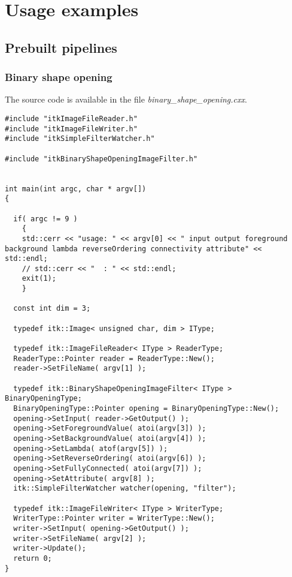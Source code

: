 \documentclass{InsightArticle}
\begin{document}
\section{Usage examples}

\subsection{Prebuilt pipelines}

\subsubsection{Binary shape opening}

The source code is available in the file {\em binary\_shape\_opening.cxx}.

\small \begin{verbatim}
#include "itkImageFileReader.h"
#include "itkImageFileWriter.h"
#include "itkSimpleFilterWatcher.h"

#include "itkBinaryShapeOpeningImageFilter.h"


int main(int argc, char * argv[])
{

  if( argc != 9 )
    {
    std::cerr << "usage: " << argv[0] << " input output foreground background lambda reverseOrdering connectivity attribute" << std::endl;
    // std::cerr << "  : " << std::endl;
    exit(1);
    }

  const int dim = 3;

  typedef itk::Image< unsigned char, dim > IType;

  typedef itk::ImageFileReader< IType > ReaderType;
  ReaderType::Pointer reader = ReaderType::New();
  reader->SetFileName( argv[1] );

  typedef itk::BinaryShapeOpeningImageFilter< IType > BinaryOpeningType;
  BinaryOpeningType::Pointer opening = BinaryOpeningType::New();
  opening->SetInput( reader->GetOutput() );
  opening->SetForegroundValue( atoi(argv[3]) );
  opening->SetBackgroundValue( atoi(argv[4]) );
  opening->SetLambda( atof(argv[5]) );
  opening->SetReverseOrdering( atoi(argv[6]) );
  opening->SetFullyConnected( atoi(argv[7]) );
  opening->SetAttribute( argv[8] );
  itk::SimpleFilterWatcher watcher(opening, "filter");

  typedef itk::ImageFileWriter< IType > WriterType;
  WriterType::Pointer writer = WriterType::New();
  writer->SetInput( opening->GetOutput() );
  writer->SetFileName( argv[2] );
  writer->Update();
  return 0;
}

\end{verbatim} \normalsize
\end{document}
